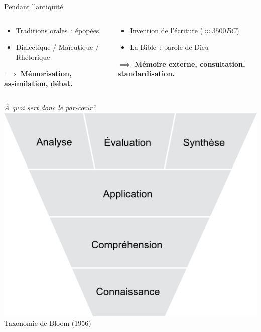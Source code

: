 \begin{frame}{Pendant l'antiquité}
\begin{columns}
\end{columns}
\begin{columns}
	\begin{column}{0.49\linewidth}
		\begin{itemize}
			\item Traditions orales~: épopées
			\item Dialectique / Maïeutique / Rhétorique
		\end{itemize}
		$\implies$ \textbf{Mémorisation, assimilation, débat.}
	\end{column}
	\begin{column}{0.49\linewidth}
		\begin{itemize}
			\item Invention de l'écriture ($\approx 3500BC$)
			\item La Bible~: parole de Dieu
		\end{itemize}
		$\implies$ \textbf{Mémoire externe, consultation, standardisation.}
	\end{column}
\end{columns}
\end{frame}
\begin{frame}

\centering
\Huge \emph{À quoi sert donc le par-c\oe{}ur?}
\vfill
\centering
\includegraphics[height=0.5\paperheight]{../resources/illustrations/bloom} \\
\vfill \hfill
\large Taxonomie de Bloom (1956) \hfill \hfill
\end{frame}

